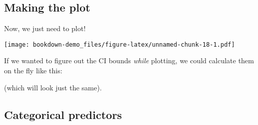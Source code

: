 \documentclass[]{book}
\newenvironment{Shaded}{\begin{snugshade}}{\end{snugshade}}
\newcommand{\CharTok}[1]{\textcolor[rgb]{0.31,0.60,0.02}{#1}}
\newcommand{\DataTypeTok}[1]{\textcolor[rgb]{0.13,0.29,0.53}{#1}}
\newcommand{\FloatTok}[1]{\textcolor[rgb]{0.00,0.00,0.81}{#1}}
\newcommand{\KeywordTok}[1]{\textcolor[rgb]{0.13,0.29,0.53}{\textbf{#1}}}
\newcommand{\NormalTok}[1]{#1}
\newcommand{\OperatorTok}[1]{\textcolor[rgb]{0.81,0.36,0.00}{\textbf{#1}}}
\newcommand{\StringTok}[1]{\textcolor[rgb]{0.31,0.60,0.02}{#1}}
\begin{document}
\hypertarget{making-the-plot}{%
\subsection{Making the plot}\label{making-the-plot}}

Now, we just need to plot!

\begin{Shaded}
\end{Shaded}

\texttt{[image: bookdown-demo\_files/figure-latex/unnamed-chunk-18-1.pdf]}

If we wanted to figure out the CI bounds \emph{while} plotting, we could calculate them on the fly like this:

\begin{Shaded}
\end{Shaded}

(which will look just the same).

\hypertarget{categorical-predictors}{%
\subsection{Categorical predictors}\label{categorical-predictors}}
\end{document}
